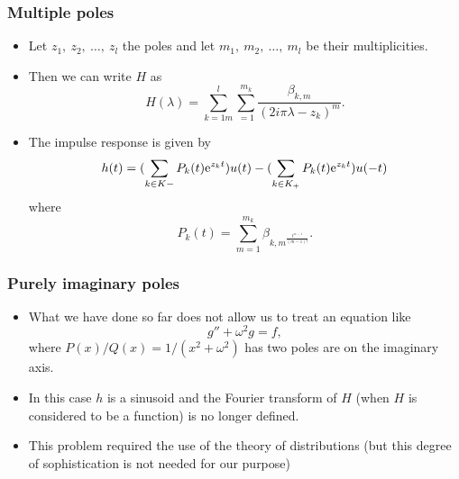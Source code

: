 \begin{frame}
\frametitle{Multiple poles}
\begin{itemize}
\item Let $z_{1},\ z_{2},\ \ldots,\ z_{l}$ the poles and let $m_{1},\ m_{2},\ \ldots,\ m_{l}$ be their multiplicities. 
\item Then we can write $H$ as
$$
H(\lambda)=\sum_{k=1m}^{l}\sum_{=1}^{m_{k}}\frac{\beta_{k,m}}{(2i\pi\lambda-z_{k})^{m}}.
$$
\item The impulse response is given by 
$$
h(t)=(\displaystyle \sum_{k\in K-}P_{k}(t) \mathrm{e}^{z_{k}t})u(t)-(\sum_{k\in K_{+}}P_{k}(t) \mathrm{e}^{z_{k}t})u(-t)
$$
where
$$
P_{k}(t)=\sum_{m=1}^{m_{k}}\beta_{k,m^{\frac{t^{m-1}}{(m-1)!}}}.
$$
\end{itemize}
\end{frame}

\begin{frame}
\frametitle{Purely imaginary poles}
\begin{itemize}
\item What we have done so far does not allow us to treat an equation like
$$
g''+\omega^{2}g=f,
$$
where $P(x)/Q(x)=1/(x^{2}+\omega^{2})$ has two poles are on the imaginary axis. 
\item In this case $h$ is a sinusoid and the Fourier transform of $H$ (when $H$ is considered to be a function) is no longer defined. 
\item This problem required the use of the theory of  distributions (but this degree of sophistication is not needed for our purpose)
\end{itemize}
\end{frame}


 